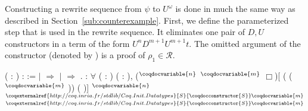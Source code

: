 Constructing a rewrite sequence from $\psi$ to $U^\omega$ is done in
much the same way as described in
Section~\ref{sub:counterexample}. First, we define the parameterized
step that is used in the rewrite sequence. It eliminates one pair of $D,
U$ constructors in a term of the form $U^n D^{m+1} U^{m+1} t$. The
omitted argument of the 
constructor (denoted by \coqdoclemma{\_}) is a proof of $\rho_1 \in
\mathcal{R}$.
\begin{singlespace}
\begin{coqdoccode}
\coqdocnoindent
{}
 ( :
) :
 :=\coqdoceol
\coqdocindent{1.00em}
    \coqdoceol
\coqdocindent{1.00em}
\ensuremath{|}  \ensuremath{\Rightarrow}
\coqdoceol
\coqdocindent{1.00em}
\ensuremath{|}  \ensuremath{\Rightarrow}
\coqdoceol
\coqdocindent{1.00em}
.\coqdoceol
\coqdocemptyline
\coqdocnoindent
{}
:
\ensuremath{\forall} (  :
)
( :
),\coqdoceol
\coqdocindent{1.00em}
($^\coqdocvariable{n}$
$^\coqdocvariable{m}$
$\Box$)[
  (
($^\coqdocvariable{m}$
    )) (
)] 
$^\coqdocvariable{n}$
$^{\coqexternalref{http://coq.inria.fr/stdlib/Coq.Init.Datatypes}{S}{\coqdocconstructor{S}} \coqdocvariable{m}}$
$^{\coqexternalref{http://coq.inria.fr/stdlib/Coq.Init.Datatypes}{S}{\coqdocconstructor{S}}
\coqdocvariable{m}}$

\end{coqdoccode}
\end{singlespace}
